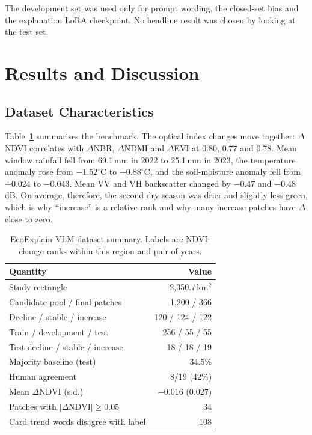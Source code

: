 \documentclass[11pt]{article}
\begin{document}
The development set was used only for prompt wording, the closed-set
bias and the explanation LoRA checkpoint. No headline result was
chosen by looking at the test set.

\section{Results and Discussion}

\subsection{Dataset Characteristics}

Table~\ref{tab:data} summarises the benchmark. The optical index changes
move together: $\Delta$NDVI correlates with $\Delta$NBR, $\Delta$NDMI
and $\Delta$EVI at 0.80, 0.77 and 0.78. Mean window rainfall fell from
69.1\,mm in 2022 to 25.1\,mm in 2023, the temperature anomaly rose from
$-1.52^\circ$C to $+0.88^\circ$C, and the soil-moisture anomaly fell
from $+0.024$ to $-0.043$. Mean VV and VH backscatter changed by $-0.47$
and $-0.48$\,dB. On average, therefore, the second dry season was drier
and slightly less green, which is why ``increase'' is a relative rank
and why many increase patches have $\Delta$ close to zero.

\begin{table}[t]
\centering
\small
\begin{tabular}{lr}
\toprule
Quantity & Value \\
\midrule
Study rectangle & 2,350.7\,km$^2$ \\
Candidate pool / final patches & 1,200 / 366 \\
Decline / stable / increase & 120 / 124 / 122 \\
Train / development / test & 256 / 55 / 55 \\
Test decline / stable / increase & 18 / 18 / 19 \\
Majority baseline (test) & 34.5\% \\
Human agreement & 8/19 (42\%) \\
Mean $\Delta$NDVI (s.d.) & $-0.016$ (0.027) \\
Patches with $|\Delta\mathrm{NDVI}| \ge 0.05$ & 34 \\
Card trend words disagree with label & 108 \\
\bottomrule
\end{tabular}
\caption{EcoExplain-VLM dataset summary. Labels are NDVI-change ranks
within this region and pair of years.}
\label{tab:data}
\end{table}
\end{document}
